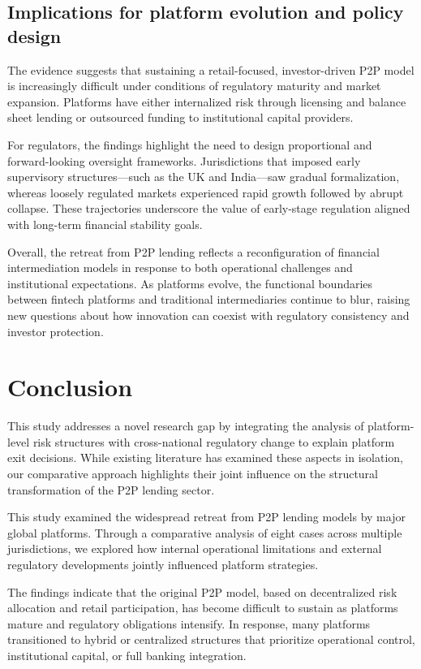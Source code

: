 \documentclass[pdflatex,sn-apa]{sn-jnl}%
\theoremstyle{thmstyleone}%
\theoremstyle{thmstyletwo}%
\theoremstyle{thmstylethree}%
\begin{document}
\subsection{Implications for platform evolution and policy design}
The evidence suggests that sustaining a retail-focused, investor-driven P2P model is increasingly difficult under conditions of regulatory maturity and market expansion. Platforms have either internalized risk through licensing and balance sheet lending or outsourced funding to institutional capital providers. 

For regulators, the findings highlight the need to design proportional and forward-looking oversight frameworks. Jurisdictions that imposed early supervisory structures—such as the UK and India—saw gradual formalization, whereas loosely regulated markets experienced rapid growth followed by abrupt collapse. These trajectories underscore the value of early-stage regulation aligned with long-term financial stability goals.

Overall, the retreat from P2P lending reflects a reconfiguration of financial intermediation models in response to both operational challenges and institutional expectations. As platforms evolve, the functional boundaries between fintech platforms and traditional intermediaries continue to blur, raising new questions about how innovation can coexist with regulatory consistency and investor protection.

\section{Conclusion}\label{sec13}

This study addresses a novel research gap by integrating the analysis of platform-level risk structures with cross-national regulatory change to explain platform exit decisions. While existing literature has examined these aspects in isolation, our comparative approach highlights their joint influence on the structural transformation of the P2P lending sector.

This study examined the widespread retreat from P2P lending models by major global platforms. Through a comparative analysis of eight cases across multiple jurisdictions, we explored how internal operational limitations and external regulatory developments jointly influenced platform strategies.

The findings indicate that the original P2P model, based on decentralized risk allocation and retail participation, has become difficult to sustain as platforms mature and regulatory obligations intensify. In response, many platforms transitioned to hybrid or centralized structures that prioritize operational control, institutional capital, or full banking integration.
\end{document}
